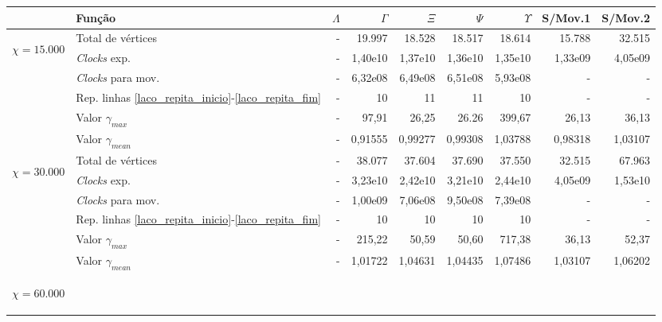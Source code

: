 \begin{table}
\begin{center}
\begin{tabular}{|c|l|r|r|r|r|r|r|r|} %
\hline
& Função & $\Lambda$ & $\Gamma$ & $\Xi$ & $\Psi$ & $\Upsilon$ & S/Mov.1 & S/Mov.2 \\
\hline %
\multirow{5}{*}{\begin{sideways}$\chi = 15.000$\end{sideways} } 
& Total de vértices                                                     & - & 19.997 & 18.528 & 18.517 & 18.614 & 15.788 & 32.515 \\
& {\it Clocks} exp.	                                             	& - & 1,40e10 & 1,37e10 & 1,36e10 & 1,35e10 & 1,33e09 & 4,05e09 \\
& {\it Clocks} para mov.                                      		& - & 6,32e08 & 6,49e08 & 6,51e08 & 5,93e08 & - & - \\
& Rep. linhas \ref{laco_repita_inicio}-\ref{laco_repita_fim} 		& - & 10 & 11 & 11 & 10 & - & - \\
& Valor $\gamma_{max}$							& - & 97,91 & 26,25 & 26.26 & 399,67 & 26,13 & 36,13 \\
& Valor $\gamma_{mean}$							& - & 0,91555 & 0,99277 & 0,99308 & 1,03788 & 0,98318 & 1,03107 \\
\hline %
\multirow{5}{*}{\begin{sideways}$\chi = 30.000$\end{sideways} } 
& Total de vértices                                                     & - & 38.077 & 37.604 & 37.690 & 37.550 & 32.515 & 67.963 \\
& {\it Clocks} exp.	                                             	& - & 3,23e10 & 2,42e10 & 3,21e10 & 2,44e10 & 4,05e09 & 1,53e10 \\
& {\it Clocks} para mov.                                      		& - & 1,00e09 & 7,06e08 & 9,50e08 & 7,39e08 & - & - \\
& Rep. linhas \ref{laco_repita_inicio}-\ref{laco_repita_fim} 		& - & 10 & 10 & 10 & 10 & - & - \\
& Valor $\gamma_{max}$							& - & 215,22 & 50,59 & 50,60 & 717,38 & 36,13 & 52,37 \\
& Valor $\gamma_{mean}$							& - & 1,01722 & 1,04631 & 1,04435 & 1,07486 & 1,03107 & 1,06202 \\
\hline %
\multirow{5}{*}{\begin{sideways}$\chi = 60.000$\end{sideways} } 

\end{tabular}
\end{center}
\end{table}
